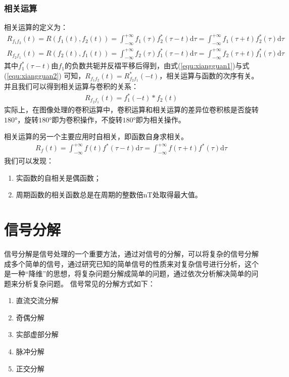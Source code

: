 \documentclass{hitreport}
\begin{document}
\subsubsection{相关运算}
相关运算的定义为：
\begin{align}\label{equ:xiangguan1}
R_{f_{1}f_{2}}\left(t\right) = R\left(f_1\left(t\right), f_2\left(t\right)\right) = \int_{-\infty}^{+\infty}{f_1\left(\tau \right) f_{2}^{*}\left(\tau -t\right) \mathrm{d}\tau} = \int_{-\infty}^{+\infty}{f_1\left(\tau +t\right) f_{2}^{*}\left(\tau\right) \mathrm{d}\tau}
\end{align}
\begin{align}\label{equ:xiangguan2}
R_{f_{2}f_{1}}\left(t\right) = R\left(f_2\left(t\right), f_1\left(t\right)\right) = \int_{-\infty}^{+\infty}{f_2\left(\tau \right) f_{1}^{*}\left(\tau -t\right) \mathrm{d}\tau} = \int_{-\infty}^{+\infty}{f_2\left(\tau +t\right) f_{1}^{*}\left(\tau\right) \mathrm{d}\tau}
\end{align}
其中$f_{1}^{*}\left(\tau -t\right)$由$f_1$的负数共轭并反褶平移后得到，由式(\ref{equ:xiangguan1})与式(\ref{equ:xiangguan2}) 可知，$R_{f_1f_2}\left(t\right) = R_{f_2f_1}^{*}\left(-t\right)$，相关运算与函数的次序有关。
并且我们可以得到相关运算与卷积的关系：
\begin{align}
R_{f_2f_1}\left(t\right) = f_{1}^{*}\left(-t\right) \ast f_2\left(t\right)
\end{align}
实际上，在图像处理的卷积运算中，卷积运算和相关运算的差异位卷积核是否旋转$180°$，旋转$180°$即为卷积操作，不旋转$180°$即为相关操作。

相关运算的另一个主要应用时自相关，即函数自身求相关。
\begin{align}
R_f\left(t\right) = \int_{-\infty}^{+\infty}{f\left(t\right) f^{*}\left(\tau -t\right)\mathrm{d}\tau} = \int_{-\infty}^{+\infty}{f\left(\tau+t\right)f^{*}\left(\tau\right)\mathrm{d} \tau}
\end{align}
我们可以发现：
\begin{enumerate}
\item 实函数的自相关是偶函数；
\item 周期函数的相关函数总是在周期的整数倍nT处取得最大值。
\end{enumerate}

\section{信号分解}

信号分解是信号处理的一个重要方法，通过对信号的分解，可以将复杂的信号分解成多个简单的信号，通过研究已知的简单信号的性质来对复杂信号进行分析，这个是一种“降维”的思想，将复杂问题分解成简单的问题，通过依次分析解决简单的问题来分析复杂问题。
信号常见的分解方式如下：
\begin{enumerate}
\item 直流交流分解
\item 奇偶分解
\item 实部虚部分解
\item 脉冲分解
\item 正交分解
\end{enumerate}
\end{document}

